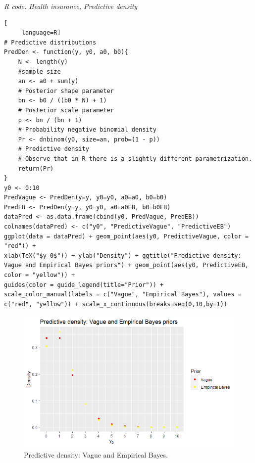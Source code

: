 \clearpage
\begin{tcolorbox}[enhanced,width=4.67in,center upper,
	fontupper=\large\bfseries,drop shadow southwest,sharp corners]
\textit{R code. Health insurance, Predictive density}
\begin{VF}
\begin{lstlisting}[
	 language=R]
# Predictive distributions
PredDen <- function(y, y0, a0, b0){
	N <- length(y)
	#sample size
	an <- a0 + sum(y) 
	# Posterior shape parameter
	bn <- b0 / ((b0 * N) + 1) 
	# Posterior scale parameter
	p <- bn / (bn + 1) 
	# Probability negative binomial density
	Pr <- dnbinom(y0, size=an, prob=(1 - p))
	# Predictive density
	# Observe that in R there is a slightly different parametrization.
	return(Pr)
}
y0 <- 0:10
PredVague <- PredDen(y=y, y0=y0, a0=a0, b0=b0)
PredEB <- PredDen(y=y, y0=y0, a0=a0EB, b0=b0EB)
dataPred <- as.data.frame(cbind(y0, PredVague, PredEB))
colnames(dataPred) <- c("y0", "PredictiveVague", "PredictiveEB")
ggplot(data = dataPred) + geom_point(aes(y0, PredictiveVague, color = "red")) +  
xlab(TeX("$y_0$")) + ylab("Density") + ggtitle("Predictive density: Vague and Empirical Bayes priors") + geom_point(aes(y0, PredictiveEB, color = "yellow")) +
guides(color = guide_legend(title="Prior")) + scale_color_manual(labels = c("Vague", "Empirical Bayes"), values = c("red", "yellow")) + scale_x_continuous(breaks=seq(0,10,by=1))
\end{lstlisting}
\end{VF}
\end{tcolorbox}

\begin{figure}[!h]
	\includegraphics[width=340pt, height=200pt]{Chapters/chapter1/figures/Predictive.png}
	\caption[List of figure caption goes here]{Predictive density: Vague and Empirical Bayes.}\label{fig14}
\end{figure}

